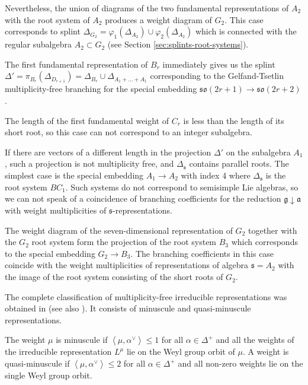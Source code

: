 \documentclass[12pt]{iopart}
\newcommand{\gf}{\mathfrak{g}}
\newcommand{\af}{\mathfrak{a}}
\newcommand{\sfr}{\mathfrak{s}}
\begin{document}
Nevertheless, the union of diagrams of the two fundamental representations of $A_{2}$ with the root
system of $A_{2}$ produces a weight diagram of $G_{2}$. This case corresponds to splint
$\Delta_{G_{2}}=\varphi_{1}( \Delta_{A_{2}})\cup \varphi_{2}(\Delta_{A_{2}})$ which is connected
with the regular subalgebra $A_{2}\subset G_{2}$ (see Section \ref{sec:splints-root-systems}).


The first fundamental representation of $B_{r}$ immediately gives us the splint $\Delta'=\pi_{B_{r}}\left(
\Delta_{D_{r+1}}\right) = \Delta_{B_{r}}\cup \Delta_{A_{1}+\dots+A_{1}}$ corresponding to the Gelfand-Tsetlin
multiplicity-free branching for the special embedding $\mathfrak{so}(2r+1)\to \mathfrak{so}(2r+2)$. 

The length of the first fundamental weight of  $C_{r}$ is less than the length of its short root, so
this case can not correspond to an integer subalgebra. 

If there are vectors of a different length in the projection $\Delta'$ on the subalgebra $A_{1}$, such a
projection is not multiplicity free, and $\Delta_{\sfr}$ contains parallel roots. The simplest case
is the special embedding $A_{1}\to A_{2}$ with index 4 where $\Delta_{\sfr}$ is the root system
$BC_{1}$. Such systems do not correspond to semisimple Lie algebras, so we can not speak of a
coincidence of branching coefficients for the reduction $\gf\downarrow \af$ with weight
multiplicities of $\sfr$-representations.

The weight diagram of the seven-dimensional representation of $G_{2}$ together with the $G_{2}$ root system
form the projection of the root system $B_{3}$ which corresponds to the special embedding 
$G_{2}\to B_{3}$. The branching coefficients in this case coincide with the weight multiplicities of
representations of algebra $\sfr=A_{2}$ with the image of the root system consisting of the short roots of
$G_{2}$. 

The complete classification of multiplicity-free irreducible representations was obtained in
\cite{howe1995perspectives} (see also \cite{stembridge2003multiplicity}). It consists of minuscule
and quasi-minuscule representations.

The weight $\mu$ is minuscule if $\left<\mu,\alpha^{\vee}\right>\leq 1$ for all $\alpha\in
\Delta^{+}$ and all the weights of the irreducible representation $L^{\mu}$ lie on the Weyl
group orbit of $\mu$. A weight is quasi-minuscule if $\left<\mu,\alpha^{\vee}\right>\leq 2$ for all
$\alpha\in \Delta^{+}$ and all non-zero weights lie on the single Weyl group orbit.
\end{document}
